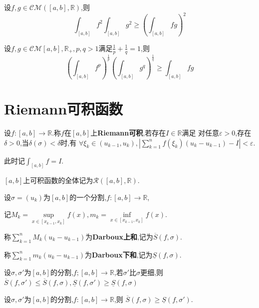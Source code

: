 \begin{thm}[Cauchy不等式]
    设$f,g\in\mathcal{CM}([a,b],\mathbb{R})$,则
    \[ \int_{[a,b]}f^2\int_{[a,b]}g^2\geqslant\left(\int_{[a,b]}fg\right)^2 \]
\end{thm}

\begin{thm}[Hölder不等式]
    设$f,g\in\mathcal{CM}{[a,b],\mathbb{R}_+},p,q>1$满足$\frac{1}{p}+\frac{1}{q}=1$,则
    \[ \left(\int_{[a,b]}f^p\right)^{\frac{1}{p}}\left(\int_{[a,b]}g^q\right)^{\frac{1}{q}}\geqslant\int_{[a,b]}fg \]
\end{thm}

\section{Riemann可积函数}

\begin{deff}
    设$f:[a,b]\to\mathbb{R}$.称$f$在$[a,b]$上\textbf{Riemann可积},若存在$I\in\mathbb{R}$满足
    对任意$\varepsilon>0$,存在$\delta>0$,当$\delta(\sigma)<\delta$时,有
    $\forall \xi_k \in (u_{k-1},u_k),\left\lvert \sum\limits_{k=1}^n f(\xi_k)(u_k-u_{k-1})-I\right\rvert<\varepsilon$.
    
    此时记$\int_{[a,b]}f=I$.

    $[a,b]$上可积函数的全体记为$\mathcal{R}([a,b],\mathbb{R})$.
\end{deff}

\begin{deff}
    设$\sigma=(u_k)$为$[a,b]$的一个分割,$f:[a,b]\to\mathbb{R}$,

    记$M_k=\sup\limits_{x\in[x_{k-1},x_k]}f(x),m_k=\inf\limits_{x\in[x_{k-1},x_k]}f(x)$.
    
    称$\sum\limits_{k=1}^n M_k(u_k-u_{k-1})$为\textbf{Darboux上和},记为$\overline{S}(f,\sigma)$.
    
    称$\sum\limits_{k=1}^n m_k(u_k-u_{k-1})$为\textbf{Darboux下和},记为$\underline{S}(f,\sigma)$.
\end{deff}

\begin{prop}
    设$\sigma,\sigma'$为$[a,b]$的分割,$f;[a,b]\to\mathbb{R}$,若$\sigma'$比$\sigma$更细,则
    $\overline{S}(f,\sigma')\leqslant\overline{S}(f,\sigma),\underline{S}(f,\sigma')\geqslant\underline{S}(f,\sigma)$
\end{prop}

\begin{prop}
    设$\sigma,\sigma'$为$[a,b]$的分割,$f:[a,b]\to\mathbb{R}$,则
    $\overline{S}(f,\sigma)\geqslant\underline{S}(f,\sigma')$.
\end{prop}


